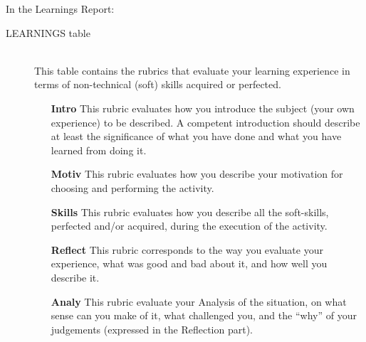 \documentclass[a4paper,12pt,journal,twoside,compsoc]{PPIEEEtran}
\begin{document}
In the Learnings Report:
\begin{description}
\item[LEARNINGS table] \hfill \\
This table contains the rubrics that evaluate your learning experience in terms of non-technical (soft) skills acquired or perfected.
\begin{itemize}
\item[\textbf{Intro}] This rubric evaluates how you introduce the subject (your own experience) to be described. A competent introduction should describe at least the significance of what you have done and what you have learned from doing it.
\item[\textbf{Motiv}] This rubric evaluates how you describe your motivation for choosing and performing the activity.
\item[\textbf{Skills}] This rubric evaluates how you describe all the soft-skills, perfected and/or acquired, during the execution of the activity.
\item[\textbf{Reflect}] This rubric corresponds to the way you evaluate your experience, what was good and bad about it, and how well you describe it.
\item[\textbf{Analy}] This rubric evaluate your Analysis of the situation, on what sense can you make of it, what challenged you, and the ``why'' of your judgements (expressed in the Reflection part).
\end{itemize}
\end{description}
\end{document}
